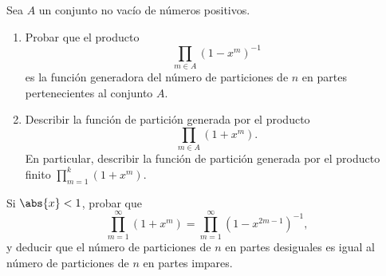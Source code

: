     \begin{ejercicio}
        Sea $A$ un conjunto no vacío de números positivos.
        \begin{enumerate}
            \item[(a)] Probar que el producto
            \begin{equation*}
                \prod_{m\in A}(1-x^m)^{-1}
            \end{equation*}
            es la función generadora del número de particiones de $n$ en partes pertenecientes
            al conjunto $A$.
            \item[(b)] Describir la función de partición generada por el producto
            \begin{equation*}
                \prod_{m\in A}(1+x^m).
            \end{equation*}
            En particular, describir la función de partición generada por el producto finito
            $\prod_{m=1}^{k}(1+x^m)$.
        \end{enumerate}
    \end{ejercicio}

    \begin{ejercicio}
        Si $\abs{x}<1$, probar que
        \begin{equation*}
            \prod_{m=1}^{\infty}(1+x^m)=\prod_{m=1}^{\infty}(1-x^{2m-1})^{-1},
        \end{equation*}
        y deducir que el número de particiones de $n$ en partes desiguales es igual al número
        de particiones de $n$ en partes impares.
    \end{ejercicio}

